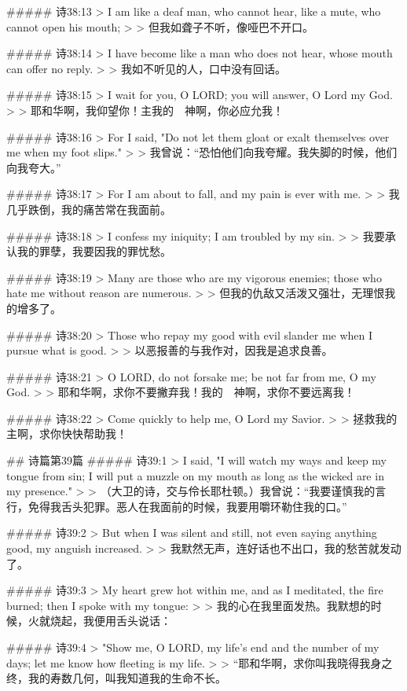 ##### 诗38:13
> I am like a deaf man, who cannot hear, like a mute, who cannot open his mouth;
>
> 但我如聋子不听，像哑巴不开口。


##### 诗38:14
> I have become like a man who does not hear, whose mouth can offer no reply.
>
> 我如不听见的人，口中没有回话。


##### 诗38:15
> I wait for you, O LORD; you will answer, O Lord my God.
>
> 耶和华啊，我仰望你！主我的　神啊，你必应允我！


##### 诗38:16
> For I said, "Do not let them gloat or exalt themselves over me when my foot slips."
>
> 我曾说：“恐怕他们向我夸耀。我失脚的时候，他们向我夸大。”


##### 诗38:17
> For I am about to fall, and my pain is ever with me.
>
> 我几乎跌倒，我的痛苦常在我面前。


##### 诗38:18
> I confess my iniquity; I am troubled by my sin.
>
> 我要承认我的罪孽，我要因我的罪忧愁。


##### 诗38:19
> Many are those who are my vigorous enemies; those who hate me without reason are numerous.
>
> 但我的仇敌又活泼又强壮，无理恨我的增多了。


##### 诗38:20
> Those who repay my good with evil slander me when I pursue what is good.
>
> 以恶报善的与我作对，因我是追求良善。


##### 诗38:21
> O LORD, do not forsake me; be not far from me, O my God.
>
> 耶和华啊，求你不要撇弃我！我的　神啊，求你不要远离我！


##### 诗38:22
> Come quickly to help me, O Lord my Savior.
>
> 拯救我的主啊，求你快快帮助我！


## 诗篇第39篇
##### 诗39:1
> I said, "I will watch my ways and keep my tongue from sin; I will put a muzzle on my mouth as long as the wicked are in my presence."
>
> （大卫的诗，交与伶长耶杜顿。）我曾说：“我要谨慎我的言行，免得我舌头犯罪。恶人在我面前的时候，我要用嚼环勒住我的口。”


##### 诗39:2
> But when I was silent and still, not even saying anything good, my anguish increased.
>
> 我默然无声，连好话也不出口，我的愁苦就发动了。


##### 诗39:3
> My heart grew hot within me, and as I meditated, the fire burned; then I spoke with my tongue:
>
> 我的心在我里面发热。我默想的时候，火就烧起，我便用舌头说话：


##### 诗39:4
> "Show me, O LORD, my life's end and the number of my days; let me know how fleeting is my life.
>
> “耶和华啊，求你叫我晓得我身之终，我的寿数几何，叫我知道我的生命不长。


